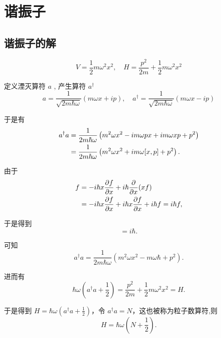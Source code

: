 \section{谐振子}
\subsection{谐振子的解}
\begin{equation}
	V = \frac{1}{2} m \omega^{2} x^{2}, \quad H = \frac{p^{2}}{2m} + \frac{1}{2} m \omega^{2} x^{2}
\end{equation}

定义湮灭算符 $a$ , 产生算符 $a^\dag$ 
\begin{equation}
	a = \frac{1}{\sqrt{2 m \hbar \omega}} (m \omega x + i p), \quad a^\dag = \frac{1}{\sqrt{2 m \hbar \omega}} (m \omega x - i p)
\end{equation}

于是有
\begin{align}
	a^\dag a &= \frac{1}{2 m \hbar \omega} \left(m^{2} \omega x^{2} - i m \omega p x + i m \omega x p + p^{2}\right) \notag \\
	&= \frac{1}{2 m \hbar \omega} \left(m^{2} \omega x^{2} + i m \omega[x, p] + p^{2}\right).
\end{align}

由于
\begin{align}
	[x, p] f &= -i \hbar x \frac{\partial f}{\partial x} + i \hbar \frac{\partial}{\partial x}(x f) \notag \\
	&= -i \hbar x \frac{\partial f}{\partial x} + i \hbar x \frac{\partial f}{\partial x} + i \hbar f = i \hbar f,
\end{align}

于是得到
\begin{equation}
	[x, p] = i \hbar.
\end{equation}

可知
\begin{equation}
	a^\dag a = \frac{1}{2 m \hbar \omega} \left(m^{2} \omega x^{2} - m \omega \hbar + p^{2}\right).
\end{equation}

进而有
\begin{equation}
	\hbar \omega \left(a^\dag a + \frac{1}{2}\right) = \frac{p^{2}}{2m} + \frac{1}{2} m \omega^{2} x^{2} = H.
\end{equation}

于是得到 $H = \hbar \omega (a^\dag a + \frac{1}{2})$，令 $a^\dag a = N$，这也被称为粒子数算符,则
\begin{equation}
	\boxed{H = \hbar \omega \left(N + \frac{1}{2}\right)}.
\end{equation}


